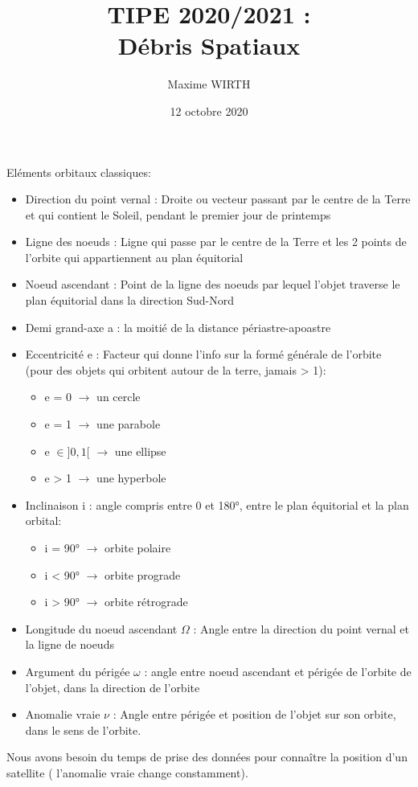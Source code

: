 \documentclass{article}
\author{Maxime WIRTH}
\title{TIPE 2020/2021 : \\ Débris Spatiaux}
\date{12 octobre 2020}
\begin{document}
\maketitle

Eléments orbitaux classiques:

\begin{itemize}
    \item Direction du point vernal : Droite ou vecteur passant par le centre de la Terre et qui contient le Soleil, pendant le premier jour de printemps
    \item Ligne des noeuds : Ligne qui passe par le centre de la Terre et les 2 points de l'orbite qui appartiennent au plan équitorial
    \item Noeud ascendant : Point de la ligne des noeuds par lequel l'objet traverse le plan équitorial dans la direction Sud-Nord
    \item Demi grand-axe a : la moitié de la distance périastre-apoastre
    \item Eccentricité e : Facteur qui donne l'info sur la formé générale de l'orbite (pour des objets qui orbitent autour de la terre, jamais > 1):
            \begin{itemize}
                \item e = 0 $\rightarrow$ un cercle
                \item e = 1 $\rightarrow$ une parabole
                \item e $\in ]0,1[$ $\rightarrow$ une ellipse
                \item e > 1 $\rightarrow$ une hyperbole
            \end{itemize}
    \item Inclinaison i : angle  compris entre 0 et 180°, entre le plan équitorial et la plan orbital:
            \begin{itemize}
                \item i = 90° $\rightarrow$ orbite polaire
                \item i < 90° $\rightarrow$ orbite prograde
                \item i > 90° $\rightarrow$ orbite rétrograde
            \end{itemize}
    \item Longitude du noeud ascendant $\Omega$ : Angle entre la direction du point vernal et la ligne de noeuds
    \item Argument du périgée $\omega$ : angle entre noeud ascendant et périgée de l'orbite de l'objet, dans la direction de l'orbite
    \item Anomalie vraie $\nu$ : Angle entre périgée et position de l'objet sur son orbite, dans le sens de l'orbite.
\end{itemize}

Nous avons besoin du temps de prise des données pour connaître la position d'un satellite ( l'anomalie vraie change constamment).
\end{document}
